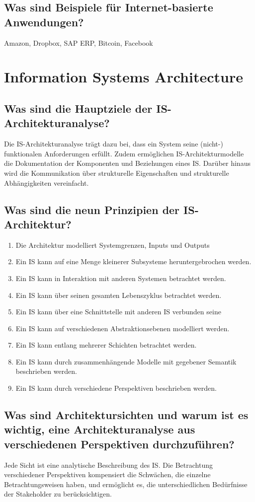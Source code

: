 \documentclass{article}
\begin{document}
\subsection{Was sind Beispiele für Internet-basierte Anwendungen?}
Amazon, Dropbox, SAP ERP, Bitcoin, Facebook
\section{Information Systems Architecture}
\subsection{Was sind die Hauptziele der IS-Architekturanalyse?}
Die IS-Architekturanalyse trägt dazu bei, dass ein System seine (nicht-) funktionalen Anforderungen erfüllt. Zudem ermöglichen IS-Architekturmodelle die Dokumentation der Komponenten und Beziehungen eines IS. Darüber hinaus wird die Kommunikation über strukturelle Eigenschaften und strukturelle Abhängigkeiten vereinfacht.
\subsection{Was sind die neun Prinzipien der IS-Architektur?}
\begin{enumerate}
    \item Die Architektur modelliert Systemgrenzen, Inputs und Outputs
    \item Ein IS kann auf eine Menge kleinerer Subsysteme heruntergebrochen werden.
    \item Ein IS kann in Interaktion mit anderen Systemen betrachtet werden.
    \item Ein IS kann über seinen gesamten Lebenszyklus betrachtet werden.
    \item Ein IS kann über eine Schnittstelle mit anderen IS verbunden seine
    \item Ein IS kann auf verschiedenen Abstraktionsebenen modelliert werden.
    \item Ein IS kann entlang mehrerer Schichten betrachtet werden.
    \item Ein IS kann durch zusammenhängende Modelle mit gegebener Semantik beschrieben werden.
    \item Ein IS kann durch verschiedene Perspektiven beschrieben werden.
\end{enumerate}
\subsection{Was sind Architektursichten und warum ist es wichtig, eine Architekturanalyse aus verschiedenen Perspektiven durchzuführen?}
Jede Sicht ist eine analytische Beschreibung des IS. Die Betrachtung verschiedener Perspektiven kompensiert die Schwächen, die einzelne Betrachtungsweisen haben, und ermöglicht es, die unterschiedlichen Bedürfnisse der Stakeholder zu berücksichtigen.
\end{document}
